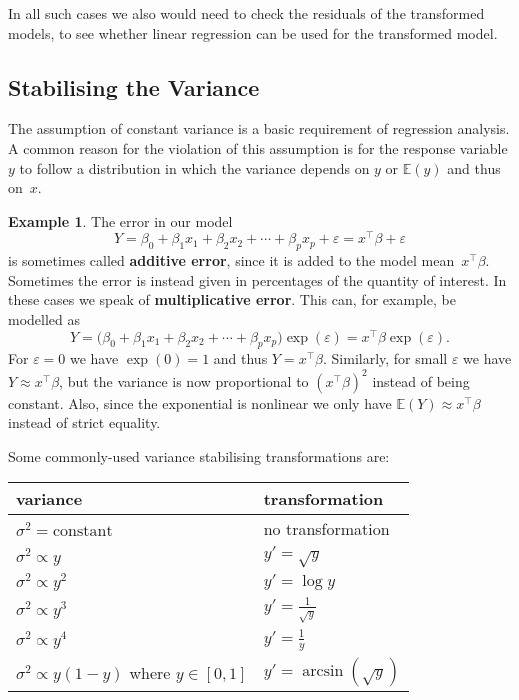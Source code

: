 \documentclass[
  a4paper,
]{article}
\theoremstyle{definition}
\theoremstyle{definition}
\newtheorem{example}{Example}[section]
\theoremstyle{definition}
\theoremstyle{definition}
\theoremstyle{remark}
\begin{document}
In all such cases we also would need to check the residuals of the transformed
models, to see whether linear regression can be used for the transformed model.

\hypertarget{stabilising-the-variance}{%
\subsection{Stabilising the Variance}\label{stabilising-the-variance}}

The assumption of constant variance is a basic requirement of regression
analysis. A common reason for the violation of this assumption is for the
response variable \(y\) to follow a distribution in which the variance depends
on \(y\) or \(\mathbb{E}(y)\) and thus on~\(x\).

\begin{example}
The error in our model
\begin{equation*}
  Y
  = \beta_0 + \beta_1 x_1 + \beta_2 x_2 + \cdots + \beta_p x_p + \varepsilon
  = x^\top \beta + \varepsilon
\end{equation*}
is sometimes called \textbf{additive error}, since it is added to the model
mean~\(x^\top\beta\). Sometimes the error is instead given in percentages of the
quantity of interest. In these cases we speak of \textbf{multiplicative error}.
This can, for example, be modelled as
\begin{equation*}
  Y
  = \bigl(\beta_0 + \beta_1 x_1 + \beta_2 x_2 + \cdots + \beta_p x_p\bigr) \exp(\varepsilon)
  = x^\top \beta \exp(\varepsilon).
\end{equation*}
For \(\varepsilon= 0\) we have \(\exp(0) = 1\) and thus \(Y = x^\top \beta\). Similarly,
for small \(\varepsilon\) we have \(Y \approx x^\top \beta\), but the variance is now
proportional to \((x^\top\beta)^2\) instead of being constant. Also, since the
exponential is nonlinear we only have \(\mathbb{E}(Y) \approx x^\top\beta\) instead of
strict equality.
\end{example}

Some commonly-used variance stabilising transformations are:

\begin{longtable}[]{@{}ll@{}}
\toprule
variance & transformation \\
\midrule
\endhead
\(\sigma^2 = \text{constant}\) & no transformation \\
\(\sigma^2 \propto y\) & \(y' = \sqrt{y}\) \\
\(\sigma^2 \propto y^2\) & \(y' = \log y\) \\
\(\sigma^2 \propto y^3\) & \(y' = \frac{1}{\sqrt{y}}\) \\
\(\sigma^2 \propto y^4\) & \(y' = \frac{1}{y}\) \\
\(\sigma^2 \propto y(1-y)\) where \(y \in [0,1]\) & \(y' = \arcsin(\sqrt{y})\) \\
\bottomrule
\end{longtable}
\end{document}
